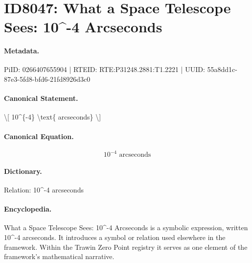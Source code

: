 \section*{ID8047: What a Space Telescope Sees: 10\textasciicircum{}-4 Arcseconds}
\paragraph{Metadata.}
PiID: 0266407655904 | RTEID: RTE:P31248.2881:T1.2221 | UUID: 55a8dd1c-87e3-5fd8-bfd6-21fd8926d3c0

\paragraph{Canonical Statement.}
\textbackslash{}[ 10\textasciicircum{}\{-4\} \textbackslash{}text\{ arcseconds\} \textbackslash{}]

\paragraph{Canonical Equation.}
\[
10^{-4} \text{ arcseconds}
\]

\paragraph{Dictionary.}
Relation: 10\textasciicircum{}-4 arcseconds

\paragraph{Encyclopedia.}
What a Space Telescope Sees: 10\textasciicircum{}-4 Arcseconds is a symbolic expression, written 10\textasciicircum{}-4 arcseconds. It introduces a symbol or relation used elsewhere in the framework. Within the Trawin Zero Point registry it serves as one element of the framework's mathematical narrative.
